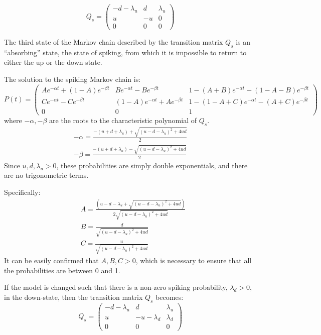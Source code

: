 \documentclass[11pt]{paper}
\begin{document}
\begin{equation}
Q_s = \begin{pmatrix} -d-\lambda_u & d & \lambda_u \\ u & -u & 0 \\ 0 & 0 & 0\end{pmatrix}
\end{equation}

The third state of the Markov chain described by the transition matrix $Q_s$ is an ``absorbing'' state, the state of spiking, from which it is impossible to return to either the up or the down state.

The solution to the spiking Markov chain is:
\begin{equation}
P(t)  = \begin{pmatrix} Ae^{-\alpha t} + (1-A)e^{-\beta t} & Be^{-\alpha t} - Be^{-\beta t} & 1 - (A+B)e^{-\alpha t} - (1-A-B)e^{-\beta t} \\ Ce^{-\alpha t} - Ce^{-\beta t} & (1-A)e^{-\alpha t} +  Ae^{-\beta t} & 1 - (1-A+C)e^{-\alpha t} - (A+C)e^{-\beta t} \\ 0 & 0 & 1 \end{pmatrix}
\end{equation}
where $-\alpha,-\beta$ are the roots to the characteristic polynomial of $Q_s$.
\begin{equation}
\begin{split}
-\alpha = \frac{-(u+d+\lambda_u) + \sqrt{(u-d-\lambda_u)^2 + 4ud}}{2}\\
-\beta = \frac{-(u+d+\lambda_u) - \sqrt{(u-d-\lambda_u)^2 + 4ud}}{2}
\end{split}
\end{equation}
Since $u,d,\lambda_u >0$, these probabilities are simply double exponentials, and there are no trigonometric terms.

Specifically:
\begin{equation}
\begin{split}
&A = \frac{\left(u-d-\lambda_u+\sqrt{(u-d-\lambda_u)^2+4ud}\right)}{2\sqrt{(u-d-\lambda_u)^2+4ud}}\\
&B = \frac{d}{\sqrt{(u-d-\lambda_u)^2+4ud}}\\
&C = \frac{u}{\sqrt{(u-d-\lambda_u)^2+4ud}}
\end{split}
\end{equation}
It can be  easily confirmed that $A,B,C>0$, which is necessary to ensure that all the probabilities are between 0 and 1.

If the model is changed such that there is a non-zero spiking probability, $\lambda_d>0$, in the down-state, then the transition matrix $Q_s$ becomes:
\begin{equation}
Q_s = \begin{pmatrix} -d-\lambda_u & d & \lambda_u \\ u & -u-\lambda_d & \lambda_d \\ 0 & 0 & 0 \end{pmatrix}
\end{equation}
\end{document}
